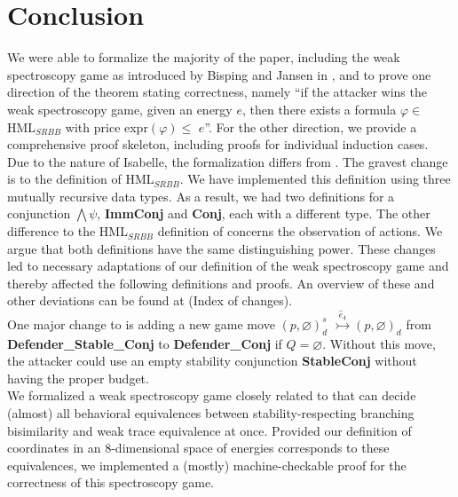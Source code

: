 \section{Conclusion}
We were able to formalize the majority of the paper, including the weak spectroscopy game as introduced by Bisping and Jansen in \cite{bisping2023lineartimebranchingtime}, 
and to prove one direction of the theorem stating correctness, namely ``if the attacker wins the weak spectroscopy game, given an energy $e$, then there exists a formula $\varphi \in$ HML$_{SRBB}$ with price expr$(\varphi) \leq$ $e$''. 
For the other direction, we provide a comprehensive proof skeleton, including proofs for individual induction cases.
\\
Due to the nature of Isabelle, the formalization differs from \cite{bisping2023lineartimebranchingtime}. The gravest change is to the definition of HML$_{SRBB}$. 
We have implemented this definition using three mutually recursive data types. As a result, we had two definitions for a conjunction $\bigwedge\psi$, \textbf{ImmConj} and \textbf{Conj}, each with a different type. 
The other difference to the HML$_{SRBB}$ definition of \cite{bisping2023lineartimebranchingtime} concerns the observation of actions. 
We argue that both definitions have the same distinguishing power. 
These changes led to necessary adaptations of our definition of the weak spectroscopy game and thereby affected the following definitions and proofs.
An overview of these and other deviations can be found at (Index of changes). 
\\
One major change to \cite{bisping2023lineartimebranchingtime} is adding a new game move $(p,\varnothing)_{d}^{s}$ $\overset{\hat{e}_4}{\rightarrowtail} (p,\varnothing)_d$ from \textbf{Defender\_Stable\_Conj} to \textbf{Defender\_Conj} if $Q = \varnothing$. 
Without this move, the attacker could use an empty stability conjunction \textbf{StableConj} without having the proper budget. 
\\
We formalized a weak spectroscopy game closely related to \cite{bisping2023lineartimebranchingtime} that can decide (almost) all behavioral equivalences between stability-respecting branching bisimilarity and weak trace equivalence at once.
Provided our definition of coordinates in an 8-dimensional space of energies corresponds to these equivalences, we implemented a (mostly) machine-checkable proof for the correctness of this spectroscopy game.

